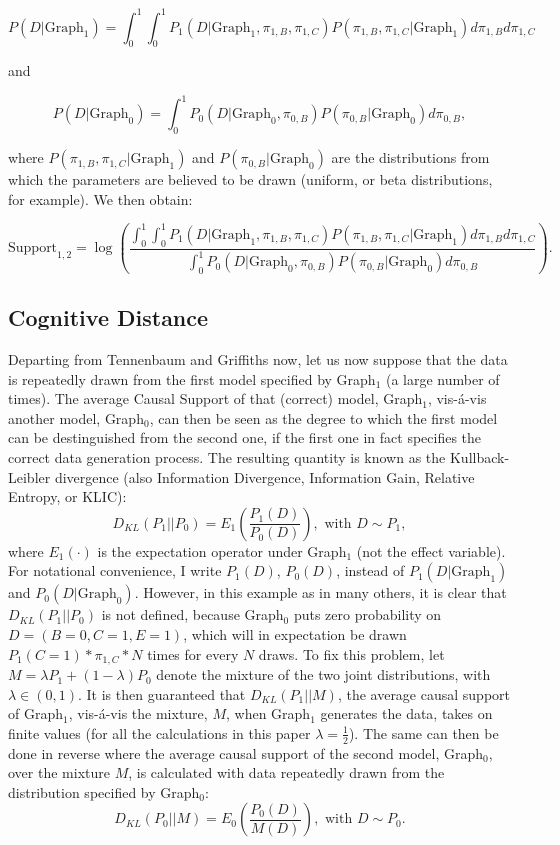\documentclass[12pt]{article}
\begin{document}
$$P(D | \text{Graph}_1)=\int_0^1 \int_0^1 P_1(D | \text{Graph}_1, \pi_{1, B}, \pi_{1, C})P(\pi_{1, B}, \pi_{1, C} | \text{Graph}_1) d\pi_{1, B} d\pi_{1, C}$$

and

$$P(D | \text{Graph}_0)=\int_0^1 P_0(D | \text{Graph}_0, \pi_{0,B}) P(\pi_{0, B} | \text{Graph}_0) d\pi_{0, B},$$

where $P(\pi_{1, B}, \pi_{1, C} | \text{Graph}_1)$ and $P(\pi_{0, B} | \text{Graph}_0)$ are the distributions from which the parameters are believed to be drawn (uniform, or beta distributions, for example). We then obtain:

$$\text{Support}_{1,2} = \log\left(\frac{\int_0^1 \int_0^1 P_1(D | \text{Graph}_1, \pi_{1, B}, \pi_{1, C})P(\pi_{1, B}, \pi_{1, C} | \text{Graph}_1) d\pi_{1, B} d\pi_{1, C}}{\int_0^1 P_0(D | \text{Graph}_0, \pi_{0,B}) P(\pi_{0, B} | \text{Graph}_0) d\pi_{0, B}}\right).$$

\subsection{Cognitive Distance}

Departing from Tennenbaum and Griffiths now, let us now suppose that the data is repeatedly drawn from the first model specified by Graph$_1$ (a large number of times). The average Causal Support of that (correct) model, Graph$_1$, vis-\'a-vis another model, Graph$_0$, can then be seen as the degree to which the first model can be destinguished from the second one, if the first one in fact specifies the correct data generation process. The resulting quantity is known as the Kullback-Leibler divergence (also Information Divergence, Information Gain, Relative Entropy, or KLIC):
$$D_{KL}(P_1 | | P_0)=E_1\left(\frac{P_1(D)}{P_0(D)}\right), \text{ with } D\sim P_1,$$
where $E_1(\cdot)$ is the expectation operator under Graph$_1$ (not the effect variable). For notational convenience, I write $P_1(D)$, $P_0(D)$, instead of $P_1(D | \text{Graph}_1)$ and $P_0(D | \text{Graph}_0)$. However, in this example as in many others, it is clear that $D_{KL}(P_1 | | P_0)$ is not defined, because Graph$_0$ puts zero probability on $D=(B=0, C=1, E=1)$, which will in expectation be drawn $P_1(C=1)*\pi_{1, C}*N$ times for every $N$ draws. To fix this problem, let $M=\lambda P_1 + (1-\lambda) P_0$ denote the mixture of the two joint distributions, with $\lambda \in (0, 1)$. It is then guaranteed that $D_{KL}(P_1 | | M)$, the average causal support of Graph$_1$, vis-\'a-vis the mixture, $M$, when Graph$_1$ generates the data, takes on finite values (for all the calculations in this paper $\lambda =\frac{1}{2}$). The same can then be done in reverse where the average causal support of the second model, Graph$_0$, over the mixture $M$, is calculated with data repeatedly drawn from the distribution specified by Graph$_0$:
$$D_{KL}(P_0 | | M)=E_0\left(\frac{P_0(D)}{M(D)}\right), \text{ with } D\sim P_0.$$
\end{document}
